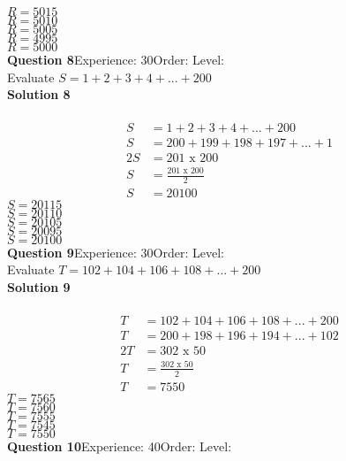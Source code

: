 \documentclass{article}
\begin{document}
$R=5015$\\
$R=5010$\\
$R=5005$\\
$R=4995$\\
$R=5000$\\
\noindent\textbf{Question 8}\hspace{20pt}Experience: 30\hspace{20pt}Order: \hspace{20pt}Level: \\[2pt]
Evaluate $S=1+2+3+4+...+200$\\[4pt]
\noindent\textbf{Solution 8}\\[2pt]
\\[-10pt]\begin{align*}
S&=1+2+3+4+...+200\\[2pt]
S&=200+199+198+197+...+1\\[2pt]
2S&=201\,\,\text{x}\,\,200\\[2pt]
S&=\displaystyle\frac{201\,\,\text{x}\,\,200}{2}\\[2pt]
S&=20100
\end{align*}
$S=20115$\\
$S=20110$\\
$S=20105$\\
$S=20095$\\
$S=20100$\\
\noindent\textbf{Question 9}\hspace{20pt}Experience: 30\hspace{20pt}Order: \hspace{20pt}Level: \\[2pt]
Evaluate $T=102+104+106+108+...+200$\\[4pt]
\noindent\textbf{Solution 9}\\[2pt]
\\[-10pt]\begin{align*}
T&=102+104+106+108+...+200\\[2pt]
T&=200+198+196+194+...+102\\[2pt]
2T&=302\,\,\text{x}\,\,50\\[2pt]
T&=\displaystyle\frac{302\,\,\text{x}\,\,50}{2}\\[2pt]
T&=7550
\end{align*}
$T=7565$\\
$T=7560$\\
$T=7555$\\
$T=7545$\\
$T=7550$\\
\noindent\textbf{Question 10}\hspace{20pt}Experience: 40\hspace{20pt}Order: \hspace{20pt}Level: \\[2pt]
\end{document}
